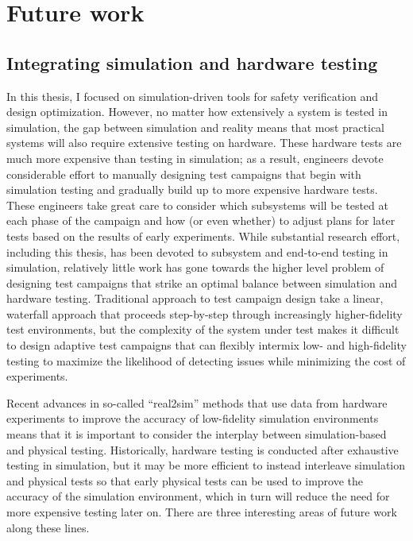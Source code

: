\section{Future work}

\subsection{Integrating simulation and hardware testing}

In this thesis, I focused on simulation-driven tools for safety verification and design optimization. However, no matter how extensively a system is tested in simulation, the gap between simulation and reality means that most practical systems will also require extensive testing on hardware. These hardware tests are much more expensive than testing in simulation; as a result, engineers devote considerable effort to manually designing test campaigns that begin with simulation testing and gradually build up to more expensive hardware tests. These engineers take great care to consider which subsystems will be tested at each phase of the campaign and how (or even whether) to adjust plans for later tests based on the results of early experiments. While substantial research effort, including this thesis, has been devoted to subsystem and end-to-end testing in simulation, relatively little work has gone towards the higher level problem of designing test campaigns that strike an optimal balance between simulation and hardware testing. Traditional approach to test campaign design take a linear, waterfall approach that proceeds step-by-step through increasingly higher-fidelity test environments, but the complexity of the system under test makes it difficult to design adaptive test campaigns that can flexibly intermix low- and high-fidelity testing to maximize the likelihood of detecting issues while minimizing the cost of experiments.

Recent advances in so-called ``real2sim'' methods that use data from hardware experiments to improve the accuracy of low-fidelity simulation environments means that it is important to consider the interplay between simulation-based and physical testing. Historically, hardware testing is conducted after exhaustive testing in simulation, but it may be more efficient to instead interleave simulation and physical tests so that early physical tests can be used to improve the accuracy of the simulation environment, which in turn will reduce the need for more expensive testing later on. There are three interesting areas of future work along these lines.

